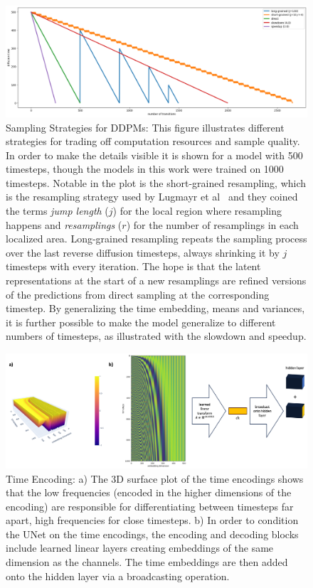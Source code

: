 \begin{figure}[h]
    \centering
    \includegraphics[width=\textwidth]{images/samplingstrategies.png}
    \caption[Sampling Strategies for DDPMs]{Sampling Strategies for DDPMs: This figure illustrates different strategies for trading off computation resources and sample quality. In order to make the details visible it is shown for a model with 500 timesteps, though the models in this work were trained on 1000 timesteps. Notable in the plot is the short-grained resampling, which is the resampling strategy used by Lugmayr et al~\autocite{lugmayr2022repaint} and they coined the terms \textit{jump length} ($j$) for the local region where resampling happens and \textit{resamplings} ($r$) for the number of resamplings in each localized area. Long-grained resampling repeats the sampling process over the last reverse diffusion timesteps, always shrinking it by $j$ timesteps with every iteration. The hope is that the latent representations at the start of a new resamplings are refined versions of the predictions from direct sampling at the corresponding timestep. By generalizing the time embedding, means and variances, it is further possible to make the model generalize to different numbers of timesteps, as illustrated with the slowdown and speedup.}
    \label{fig:stepsplot}
\end{figure}

\begin{figure}
    \centering
    \includegraphics[width=\textwidth]{images/t_embedding.png}
    \caption[Plots of Time Encoding]{Time Encoding: a) The 3D surface plot of the time encodings shows that the low frequencies (encoded in the higher dimensions of the encoding) are responsible for differentiating between timesteps far apart, high frequencies for close timesteps. b) In order to condition the UNet on the time encodings, the encoding and decoding blocks include learned linear layers creating embeddings of the same dimension as the channels. The time embeddings are then added onto the hidden layer via a broadcasting operation.}
    \label{fig:timeencoding}
\end{figure}